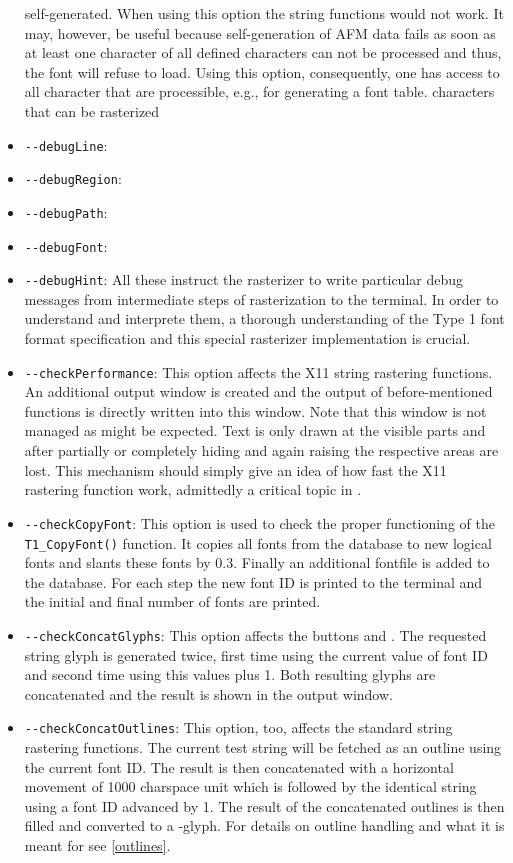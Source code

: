 \begin{itemize}
  self-generated. When using this option the string functions would not
  work. It may, however, be useful because self-generation of AFM data fails
  as soon as at least one character of all defined characters can not be
  processed and thus, the font will refuse to load. Using this option,
  consequently, one has access to all character that are processible, e.g.,
  for generating a font table.
  characters that can be rasterized 
\item\verb+--debugLine+:
\item\verb+--debugRegion+:
\item\verb+--debugPath+:
\item\verb+--debugFont+:
\item\verb+--debugHint+: All these instruct the rasterizer to write particular
  debug messages from intermediate steps of rasterization to the terminal. In
  order to understand and interprete them, a thorough understanding of the
  Type 1 font format specification and this special rasterizer implementation
  is crucial.
\item\verb+--checkPerformance+: This option affects the X11 string rastering
  functions. An additional output window is created and the output of
  before-mentioned functions is directly written into this window. Note that
  this window is not managed as might be expected. Text is only drawn at the
  visible parts and after partially or completely hiding and again
  raising the respective areas are lost. This mechanism should simply give an
  idea of how fast the X11 rastering function work, admittedly a critical
  topic in \tonelib.
\item\verb+--checkCopyFont+: This option is used to check the proper
  functioning of the \verb+T1_CopyFont()+ function. It copies all fonts from
  the database to new logical fonts and slants these fonts by 0.3. Finally an
  additional fontfile is added to the database. For each step the new font ID
  is printed to the terminal and the initial and final number of fonts are
  printed. 
\item\verb+--checkConcatGlyphs+: This option affects the buttons  and . The requested string glyph is generated
  twice, first time using the current value of font ID and second time using
  this 
  values plus 1. Both resulting glyphs are concatenated and the result is
  shown in the output window. 
\item\verb+--checkConcatOutlines+: This option, too, affects the standard
  string rastering functions. The current test string will be fetched as an
  outline using the current font ID. The result is then concatenated with a
  horizontal movement of 1000 charspace unit which is followed by the
  identical string using a font ID advanced by 1. The result of the
  concatenated outlines is then filled and converted to a \tonelib-glyph. 
  For details on outline handling and what it is meant for see \ref{outlines}.
  

\end{itemize}
